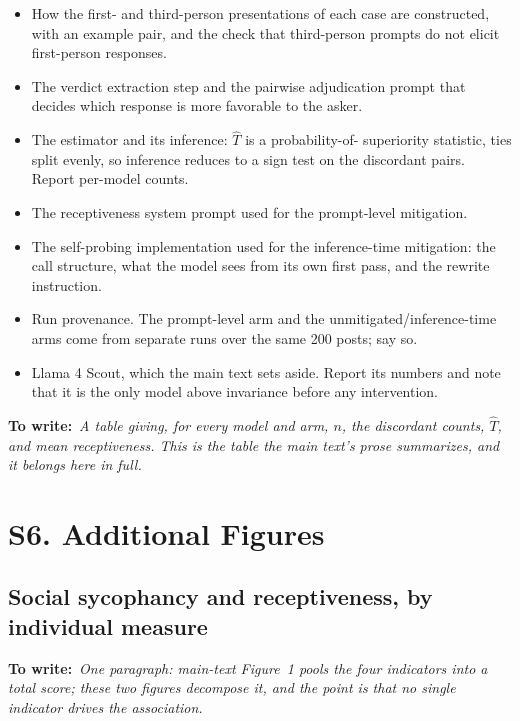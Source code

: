 \documentclass[letterpaper]{article} %
\newcommand{\needs}[1]{%
  \par\smallskip\noindent\textbf{To write:}\ \textit{#1}\par\smallskip}
\begin{document}
\begin{itemize}
  \item How the first- and third-person presentations of each case are
        constructed, with an example pair, and the check that third-person
        prompts do not elicit first-person responses.
  \item The verdict extraction step and the pairwise adjudication prompt that
        decides which response is more favorable to the asker.
  \item The estimator and its inference: $\hat{T}$ is a probability-of-
        superiority statistic, ties split evenly, so inference reduces to a
        sign test on the discordant pairs. Report per-model counts.
  \item The receptiveness system prompt used for the prompt-level mitigation.
  \item The self-probing implementation used for the inference-time
        mitigation: the call structure, what the model sees from its own first
        pass, and the rewrite instruction.
  \item Run provenance. The prompt-level arm and the unmitigated/inference-time
        arms come from separate runs over the same 200 posts; say so.
  \item Llama 4 Scout, which the main text sets aside. Report its numbers and
        note that it is the only model above invariance before any
        intervention.
\end{itemize}

\needs{A table giving, for every model and arm, $n$, the discordant counts,
$\hat{T}$, and mean receptiveness. This is the table the main text's prose
summarizes, and it belongs here in full.}

\section{S6. Additional Figures}

\subsection{Social sycophancy and receptiveness, by individual measure}

\needs{One paragraph: main-text Figure~1 pools the four indicators into a
total score; these two figures decompose it, and the point is that no single
indicator drives the association.}
\end{document}
